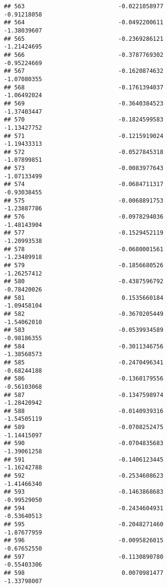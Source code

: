 \documentclass[
]{article}
\begin{document}
\begin{verbatim}
## 563                           -0.0221058977                -0.91218058
## 564                           -0.0492200611                -1.38039607
## 565                           -0.2369286121                -1.21424695
## 566                           -0.3787769302                -0.95224669
## 567                           -0.1620874632                -1.07080355
## 568                           -0.1761394037                -1.06492024
## 569                           -0.3640384523                -1.37403447
## 570                           -0.1824599583                -1.13427752
## 571                           -0.1215919024                -1.19433313
## 572                           -0.0527845318                -1.07899851
## 573                           -0.0083977643                -1.07133499
## 574                           -0.0684711317                -0.93038455
## 575                           -0.0068891753                -1.23887786
## 576                           -0.0978294036                -1.48143904
## 577                           -0.1529452119                -1.20993538
## 578                           -0.0680001561                -1.23489918
## 579                           -0.1856680526                -1.26257412
## 580                           -0.4387596792                -0.78420026
## 581                            0.1535660184                -1.09458104
## 582                           -0.3670205449                -1.54062010
## 583                           -0.0539934589                -0.98186355
## 584                           -0.3011346756                -1.38568573
## 585                           -0.2470496341                -0.68244188
## 586                           -0.1360179556                -0.56103068
## 587                           -0.1347598974                -1.28420942
## 588                           -0.0140939316                -1.54505119
## 589                           -0.0708252475                -1.14415097
## 590                           -0.0704835683                -1.39061258
## 591                           -0.1406123445                -1.16242788
## 592                           -0.2534608623                -1.41466340
## 593                           -0.1463868683                -0.99529050
## 594                           -0.2434604931                -0.53640513
## 595                           -0.2048271460                -1.87677959
## 596                           -0.0095826015                -0.67652550
## 597                           -0.1130890780                -0.55403306
## 598                            0.0070981477                -1.33798007

\end{verbatim}
\end{document}
